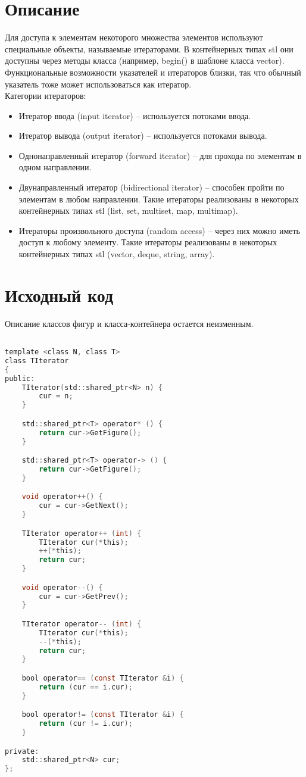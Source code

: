 \section{Описание}

Для доступа к элементам некоторого множества элементов используют специальные объекты, называемые итераторами. В контейнерных типах stl они доступны через методы класса (например, begin() в шаблоне класса vector). Функциональные возможности указателей и итераторов близки, так что обычный указатель тоже может использоваться как итератор.\\

Категории итераторов:
\begin{itemize}
\item{Итератор ввода (input iterator) -- используется потоками ввода.}
\item{Итератор вывода (output iterator) -- используется потоками вывода.}
\item{Однонаправленный итератор (forward iterator) -- для прохода по элементам в одном направлении.}
\item{Двунаправленный итератор (bidirectional iterator) -- способен пройти по элементам в любом направлении. Такие итераторы реализованы в некоторых контейнерных типах stl (list, set, multiset, map, multimap).}
\item{Итераторы произвольного доступа (random access) -- через них можно иметь доступ к любому элементу. Такие итераторы реализованы в некоторых контейнерных типах stl (vector, deque, string, array).}
\end{itemize}


\section{Исходный код}

Описание классов фигур и класса-контейнера остается неизменным.
\begin{lstlisting}[language=C]

template <class N, class T>
class TIterator
{
public:
    TIterator(std::shared_ptr<N> n) {
        cur = n;
    }

    std::shared_ptr<T> operator* () {
        return cur->GetFigure();
    }

    std::shared_ptr<T> operator-> () {
        return cur->GetFigure();
    }

    void operator++() {
        cur = cur->GetNext();
    }

    TIterator operator++ (int) {
        TIterator cur(*this);
        ++(*this);
        return cur;
    }

    void operator--() {
        cur = cur->GetPrev();
    }

    TIterator operator-- (int) {
        TIterator cur(*this);
        --(*this);
        return cur;
    }

    bool operator== (const TIterator &i) {
        return (cur == i.cur);
    }

    bool operator!= (const TIterator &i) {
        return (cur != i.cur);
    }

private:
    std::shared_ptr<N> cur;
};

\end{lstlisting}


